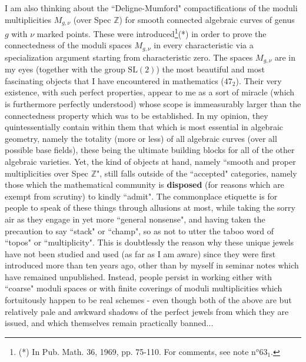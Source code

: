 I am also thinking about the ``Deligne-Mumford" compactifications of the moduli multiplicities $M_{g, \nu}$ (over Spec $\mathbb{Z}$) for smooth connected algebraic curves of genus $g$ with $\nu$ marked points. These were introduced\footnote{(*) In Pub. Math. 36, 1969, pp. 75-110. For comments, see note n$^o 63_1$.}(*) in order to prove the connectedness of the moduli spaces $M_{g, \nu}$ in every characteristic via a specialization argument starting from characteristic zero. The spaces $M_{g, \nu}$ are in my eyes (together with the group $\text{SL}(2)$)  the most beautiful and most fascinating objects that I have encountered in mathematics ($47_2$).
Their very existence, with such perfect properties, appear to me as a sort of miracle (which is furthermore perfectly understood) whose scope is immeasurably larger than the connectedness property which was to be established. In my opinion, they quintessentially contain within them that which is most essential in algebraic geometry, namely the totality (more or less) of all algebraic curves (over all possible base fields), these being the ultimate building blocks for all of the other algebraic varieties. Yet, the kind of objects at hand, namely ``smooth and proper multiplicities over Spec $\mathbb{Z}$", still falls outside of the ``accepted" categories, namely those which the mathematical community is \textbf{disposed} (for reasons which are exempt from scrutiny) to kindly ``admit". The commonplace etiquette is for people to speak of these things through allusions at most, while taking the sorry air as they engage in yet more ``general nonsense", and having taken the precaution to say ``stack" or ``champ", so as not to utter the taboo word of ``topos" or ``multiplicity". This is doubtlessly the reason why these unique jewels have not been studied and used (as far as I am aware) since they were first introduced more than ten years ago, other than by myself in seminar notes which have remained unpublished. Instead, people persist in working either with ``coarse" moduli spaces or with finite coverings of moduli multiplicities which fortuitously happen to be real schemes - even though both of the above are but relatively pale and awkward shadows of the perfect jewels from which they are issued, and which themselves remain practically banned...

